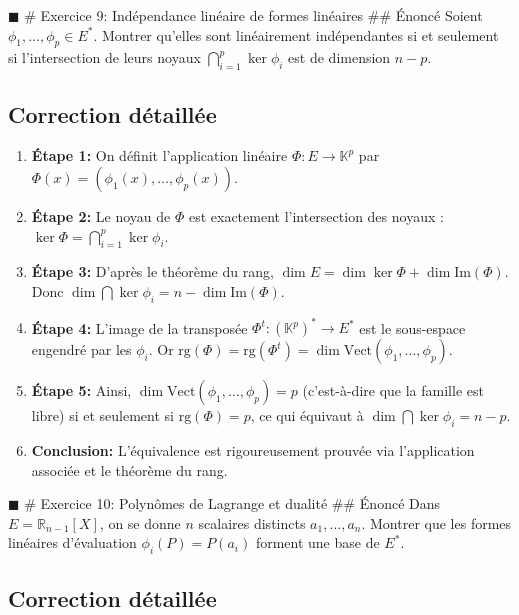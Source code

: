 \(\blacksquare\) \# Exercice 9: Indépendance linéaire de formes
linéaires \#\# Énoncé Soient \(\phi_1, \dots, \phi_p \in E^*\). Montrer
qu'elles sont linéairement indépendantes si et seulement si
l'intersection de leurs noyaux \(\bigcap_{i=1}^p \ker \phi_i\) est de
dimension \(n-p\).

\hypertarget{correction-duxe9tailluxe9e-8}{%
\subsection{Correction détaillée}\label{correction-duxe9tailluxe9e-8}}

\begin{enumerate}
\def\labelenumi{\arabic{enumi}.}
\tightlist
\item
  \textbf{Étape 1:} On définit l'application linéaire
  \(\Phi : E \to \mathbb{K}^p\) par
  \(\Phi(x) = (\phi_1(x), \dots, \phi_p(x))\).
\item
  \textbf{Étape 2:} Le noyau de \(\Phi\) est exactement l'intersection
  des noyaux : \(\ker \Phi = \bigcap_{i=1}^p \ker \phi_i\).
\item
  \textbf{Étape 3:} D'après le théorème du rang,
  \(\dim E = \dim \ker \Phi + \dim \text{Im}(\Phi)\). Donc
  \(\dim \bigcap \ker \phi_i = n - \dim \text{Im}(\Phi)\).
\item
  \textbf{Étape 4:} L'image de la transposée
  \(\Phi^t : (\mathbb{K}^p)^* \to E^*\) est le sous-espace engendré par
  les \(\phi_i\). Or
  \(\text{rg}(\Phi) = \text{rg}(\Phi^t) = \dim \text{Vect}(\phi_1, \dots, \phi_p)\).
\item
  \textbf{Étape 5:} Ainsi,
  \(\dim \text{Vect}(\phi_1, \dots, \phi_p) = p\) (c'est-à-dire que la
  famille est libre) si et seulement si \(\text{rg}(\Phi) = p\), ce qui
  équivaut à \(\dim \bigcap \ker \phi_i = n - p\).
\item
  \textbf{Conclusion:} L'équivalence est rigoureusement prouvée via
  l'application associée et le théorème du rang.
\end{enumerate}

\(\blacksquare\) \# Exercice 10: Polynômes de Lagrange et dualité \#\#
Énoncé Dans \(E = \mathbb{R}_{n-1}[X]\), on se donne \(n\) scalaires
distincts \(a_1, \dots, a_n\). Montrer que les formes linéaires
d'évaluation \(\phi_i(P) = P(a_i)\) forment une base de \(E^*\).

\hypertarget{correction-duxe9tailluxe9e-9}{%
\subsection{Correction détaillée}\label{correction-duxe9tailluxe9e-9}}

